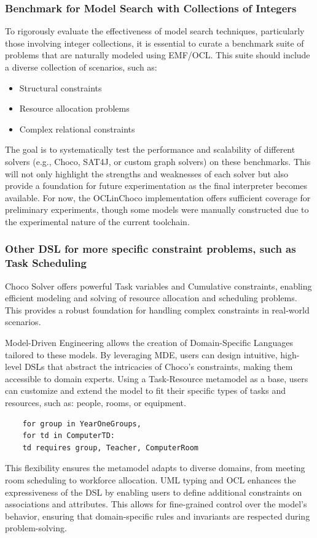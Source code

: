 \subsubsection*{Benchmark for Model Search with Collections of Integers}
To rigorously evaluate the effectiveness of model search techniques, particularly those involving integer collections, it is essential to curate a benchmark suite of problems that are naturally modeled using EMF/OCL. This suite should include a diverse collection of scenarios, such as:
\begin{itemize}
\item Structural constraints 
\item Resource allocation problems 
\item Complex relational constraints 
\end{itemize}
The goal is to systematically test the performance and scalability of different solvers (e.g., Choco, SAT4J, or custom graph solvers) on these benchmarks. This will not only highlight the strengths and weaknesses of each solver but also provide a foundation for future experimentation as the final interpreter becomes available. For now, the OCLinChoco implementation offers sufficient coverage for preliminary experiments, though some models were manually constructed due to the experimental nature of the current toolchain.


\subsubsection*{Other DSL for more specific constraint problems, such as Task Scheduling}
Choco Solver offers powerful Task variables and Cumulative constraints, enabling efficient modeling and solving of resource allocation and scheduling problems. This provides a robust foundation for handling complex constraints in real-world scenarios.

Model-Driven Engineering allows the creation of Domain-Specific Languages tailored to these models. By leveraging MDE, users can design intuitive, high-level DSLs that abstract the intricacies of Choco’s constraints, making them accessible to domain experts.
Using a Task-Resource metamodel as a base, users can customize and extend the model to fit their specific types of tasks and resources, such as: people, rooms, or equipment.
\begin{lstlisting}
    for group in YearOneGroups, 
    for td in ComputerTD: 
    td requires group, Teacher, ComputerRoom
\end{lstlisting}
This flexibility ensures the metamodel adapts to diverse domains, from meeting room scheduling to workforce allocation.
UML typing and OCL enhances the expressiveness of the DSL by enabling users to define additional constraints on associations and attributes. 
This allows for fine-grained control over the model’s behavior, ensuring that domain-specific rules and invariants are respected during problem-solving.

